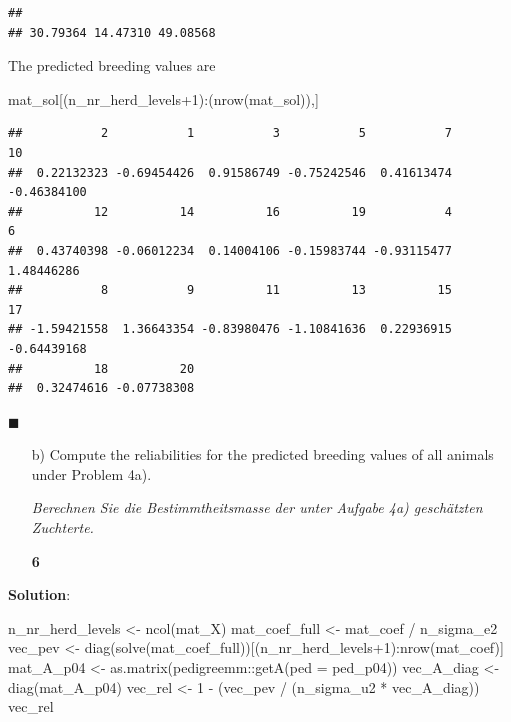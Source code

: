 \documentclass[
]{article}
\newenvironment{Shaded}{\begin{snugshade}}{\end{snugshade}}
\newcommand{\AttributeTok}[1]{\textcolor[rgb]{0.77,0.63,0.00}{#1}}
\newcommand{\DecValTok}[1]{\textcolor[rgb]{0.00,0.00,0.81}{#1}}
\newcommand{\FunctionTok}[1]{\textcolor[rgb]{0.00,0.00,0.00}{#1}}
\newcommand{\NormalTok}[1]{#1}
\newcommand{\OtherTok}[1]{\textcolor[rgb]{0.56,0.35,0.01}{#1}}
\newcommand{\SpecialCharTok}[1]{\textcolor[rgb]{0.00,0.00,0.00}{#1}}
\newcommand{\points}[1]
{\begin{flushright}\textbf{#1}\end{flushright}}
\newcommand{\solstart}
{\vspace{3ex}\textbf{Solution}:}
\newcommand{\solend}
{\vspace{2ex}$\blacksquare$}
\begin{document}
\begin{verbatim}
##                            
## 30.79364 14.47310 49.08568
\end{verbatim}

The predicted breeding values are

\begin{Shaded}
\begin{Highlighting}[]
\NormalTok{mat\_sol[(n\_nr\_herd\_levels}\SpecialCharTok{+}\DecValTok{1}\NormalTok{)}\SpecialCharTok{:}\NormalTok{(}\FunctionTok{nrow}\NormalTok{(mat\_sol)),]}
\end{Highlighting}
\end{Shaded}

\begin{verbatim}
##           2           1           3           5           7          10 
##  0.22132323 -0.69454426  0.91586749 -0.75242546  0.41613474 -0.46384100 
##          12          14          16          19           4           6 
##  0.43740398 -0.06012234  0.14004106 -0.15983744 -0.93115477  1.48446286 
##           8           9          11          13          15          17 
## -1.59421558  1.36643354 -0.83980476 -1.10841636  0.22936915 -0.64439168 
##          18          20 
##  0.32474616 -0.07738308
\end{verbatim}

\solend

\clearpage
\pagebreak

\begin{enumerate}
\item[b)] Compute the reliabilities for the predicted breeding values of all animals under Problem 4a).

\textit{Berechnen Sie die Bestimmtheitsmasse der unter Aufgabe 4a) geschätzten Zuchterte.}
\points{6}
\end{enumerate}

\solstart

\begin{Shaded}
\begin{Highlighting}[]
\NormalTok{n\_nr\_herd\_levels }\OtherTok{\textless{}{-}} \FunctionTok{ncol}\NormalTok{(mat\_X)}
\NormalTok{mat\_coef\_full }\OtherTok{\textless{}{-}}\NormalTok{ mat\_coef }\SpecialCharTok{/}\NormalTok{ n\_sigma\_e2}
\NormalTok{vec\_pev }\OtherTok{\textless{}{-}} \FunctionTok{diag}\NormalTok{(}\FunctionTok{solve}\NormalTok{(mat\_coef\_full))[(n\_nr\_herd\_levels}\SpecialCharTok{+}\DecValTok{1}\NormalTok{)}\SpecialCharTok{:}\FunctionTok{nrow}\NormalTok{(mat\_coef)]}
\NormalTok{mat\_A\_p04 }\OtherTok{\textless{}{-}} \FunctionTok{as.matrix}\NormalTok{(pedigreemm}\SpecialCharTok{::}\FunctionTok{getA}\NormalTok{(}\AttributeTok{ped =}\NormalTok{ ped\_p04))}
\NormalTok{vec\_A\_diag }\OtherTok{\textless{}{-}} \FunctionTok{diag}\NormalTok{(mat\_A\_p04)}
\NormalTok{vec\_rel }\OtherTok{\textless{}{-}} \DecValTok{1} \SpecialCharTok{{-}}\NormalTok{ (vec\_pev }\SpecialCharTok{/}\NormalTok{ (n\_sigma\_u2 }\SpecialCharTok{*}\NormalTok{ vec\_A\_diag))}
\NormalTok{vec\_rel}
\end{Highlighting}
\end{Shaded}
\end{document}
